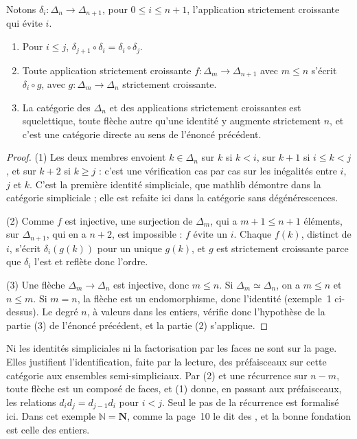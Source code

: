 \begin{enonce}
Notons $\delta_i : \Delta_n \to \Delta_{n+1}$, pour $0 \leq i \leq n + 1$, l'application strictement croissante qui évite $i$.
\begin{enumerate}
\item Pour $i \leq j$, $\delta_{j+1} \circ \delta_i = \delta_i \circ \delta_j$.
\item Toute application strictement croissante $f : \Delta_m \to \Delta_{n+1}$ avec $m \leq n$ s'écrit $\delta_i \circ g$, avec $g : \Delta_m \to \Delta_n$ strictement croissante.
\item La catégorie des $\Delta_n$ et des applications strictement croissantes est squelettique, toute flèche autre qu'une identité y augmente strictement $n$, et c'est une catégorie directe au sens de l'énoncé précédent.
\end{enumerate}
\end{enonce}

\begin{proof}
(1) Les deux membres envoient $k \in \Delta_n$ sur $k$ si $k < i$, sur $k + 1$ si $i \leq k < j$, et sur $k + 2$ si $k \geq j$ : c'est une vérification cas par cas sur les inégalités entre $i$, $j$ et $k$. C'est la première identité simpliciale, que mathlib démontre dans la catégorie simpliciale ; elle est refaite ici dans la catégorie sans dégénérescences.

(2) Comme $f$ est injective, une surjection de $\Delta_m$, qui a $m + 1 \leq n + 1$ éléments, sur $\Delta_{n+1}$, qui en a $n + 2$, est impossible : $f$ évite un $i$. Chaque $f(k)$, distinct de $i$, s'écrit $\delta_i(g(k))$ pour un unique $g(k)$, et $g$ est strictement croissante parce que $\delta_i$ l'est et reflète donc l'ordre.

(3) Une flèche $\Delta_m \to \Delta_n$ est injective, donc $m \leq n$. Si $\Delta_m \simeq \Delta_n$, on a $m \leq n$ et $n \leq m$. Si $m = n$, la flèche est un endomorphisme, donc l'identité (exemple~1 ci-dessus). Le degré $n$, à valeurs dans les entiers, vérifie donc l'hypothèse de la partie (3) de l'énoncé précédent, et la partie (2) s'applique.
\end{proof}

\begin{remarque}
Ni les identités simpliciales ni la factorisation par les faces ne sont sur la page. Elles justifient l'identification, faite par la lecture, des préfaisceaux sur cette catégorie aux ensembles semi-simpliciaux. Par (2) et une récurrence sur $n - m$, toute flèche est un composé de faces, et (1) donne, en passant aux préfaisceaux, les relations $d_i d_j = d_{j-1} d_i$ pour $i < j$. Seul le pas de la récurrence est formalisé ici. Dans cet exemple $\mathbb N = \mathbf N$, comme la page~10 le dit des , et la bonne fondation est celle des entiers.
\end{remarque}

